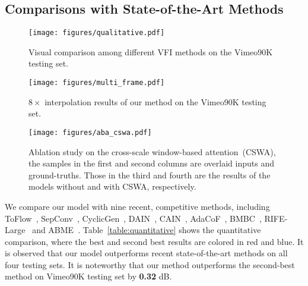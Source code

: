 \documentclass[10pt,twocolumn,letterpaper]{article}
\begin{document}
	
	
	
	
	
	
	


	\subsection{Comparisons with State-of-the-Art Methods}
	
	\begin{figure*}[t]
		\begin{center}
\texttt{[image: figures/qualitative.pdf]}
		\end{center}
		\vspace{-0.15in}
		\caption{Visual comparison among different VFI methods on the Vimeo90K testing set.}
		\label{fig:qualitative}
		\vspace{-0.1in}
	\end{figure*}
	
	
	\begin{figure*}[t]
		\begin{center}
\texttt{[image: figures/multi\_frame.pdf]}
		\end{center}
		\vspace{-0.1in}
		\caption{$8 \times$ interpolation results of our method on the Vimeo90K testing set.}
		\label{fig:multi_frame}
	\end{figure*}
	
	
	
	
	\begin{figure}[t]
		\begin{center}
\texttt{[image: figures/aba\_cswa.pdf]}
		\end{center}
		\vspace{-0.05in}
		\caption{Ablation study on the cross-scale window-based attention~(CSWA), the samples in the first and second columns are overlaid inputs and ground-truths. Those in the third and fourth are the results of the models without and with CSWA, respectively.}
		\label{fig:aba_cswa}
		\vspace{-0.1in}
	\end{figure}
	
	We compare our model with nine recent, competitive methods, including ToFlow~\cite{vimeo90k}, SepConv~\cite{niklaus2017video}, CyclicGen~\cite{liu2019deep}, DAIN~\cite{bao2019depth}, CAIN~\cite{snufilm}, AdaCoF~\cite{lee2020adacof}, BMBC~\cite{park2020bmbc}, RIFE-Large~\cite{rife} and ABME~\cite{asymmetric}. Table~\ref{table:quantitative} shows the quantitative comparison, where the best and second best results are colored in red and blue. It is observed that our model outperforms recent state-of-the-art methods on all four testing sets.
	It is noteworthy that our method outperforms the second-best method on Vimeo90K testing set by \textbf{0.32} dB.
	
\end{document}
